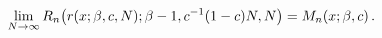 \[\lim_{N\to\infty}\mathop{R_{n}\/}\nolimits\!\left(r(x;\beta,c,N);\beta-1,c^{-1%
}(1-c)N,N\right)=\mathop{M_{n}\/}\nolimits\!\left(x;\beta,c\right).\]
